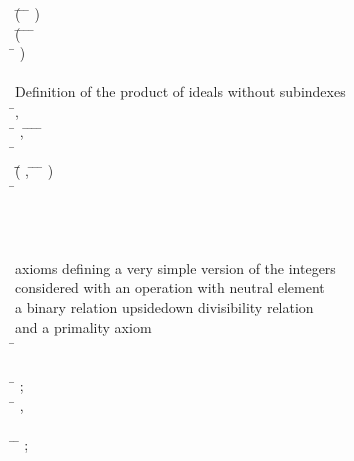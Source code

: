 \begin{hetcasl}
\>\>\>\> \Ax{\wedge} (\=   \Ax{\wedge} \=   \Ax{\Rightarrow} \= \Ax{*}   ) \\
\>\>\>\> \Ax{\wedge} (\=   \Ax{\wedge} \=   \Ax{\wedge} \=   \Ax{\wedge} \= \Ax{+}  \Ax{=}  \\
\>\>\>\>\> \Ax{\Rightarrow} \= \Ax{+}   )\\
\> \\
\> {\small{}\KW{\%\%} Definition of the product of ideals without subindexes}\\
\> \Ax{\forall} \=,  \Ax{:}  \\
\> \Ax{\bullet} \=\Ax{\forall} ,  \Ax{:}  \Ax{\bullet} \=   \Ax{\wedge} \=   \Ax{\Rightarrow} \= \Ax{*}   \= \Ax{**} \\
\> \Ax{\bullet} \=\Ax{\forall}  \Ax{:}  \\
\>\> \Ax{\bullet} \=(\=\Ax{\forall} ,  \Ax{:}  \Ax{\bullet} \=   \Ax{\wedge} \=   \Ax{\Rightarrow} \= \Ax{*}   ) \\
\>\>\> \Ax{\Rightarrow} \= \Ax{**}   \\
\\
\\
\\
{\small{}\KW{\%\%}\Ax{\%}axioms defining a very simple version of the integers\Ax{,}}\\
{\small{}\KW{\%\%}\Ax{\%}considered with an operation \Ax{*} with neutral element\Ax{,}}\\
{\small{}\KW{\%\%}\Ax{\%} a binary relation \Ax{|}\Ax{|} \Ax{(}upside\Ax{-}down divisibility relation\Ax{)}}\\
{\small{}\KW{\%\%}\Ax{\%} and a primality axiom}\\
\SPEC \= \Ax{=}\\
\> \SORT {}\\
\> \OPS \= \Ax{:} ;\\
\>\> \Ax{\_\_}\Ax{\_\_} \Ax{:} \= \Ax{\times}  \Ax{\rightarrow} , \\
\>\>  \\
\> \PREDS \=\Ax{\_\_}\Ax{||}\Ax{\_\_} \Ax{:} \= \Ax{\times} ;\\

\end{hetcasl}
